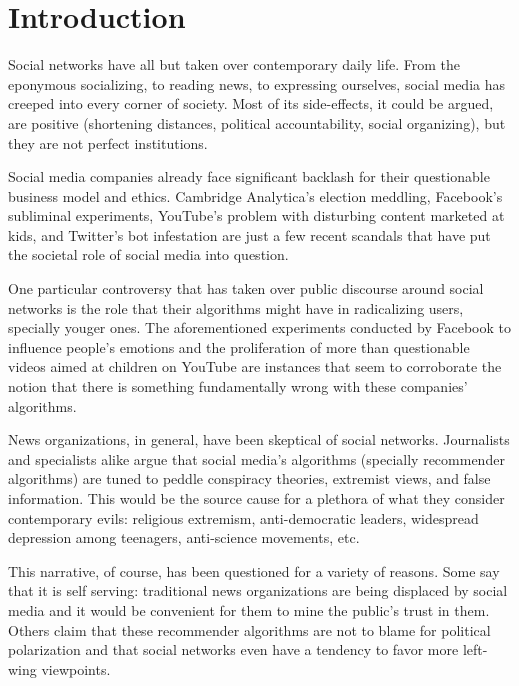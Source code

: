 
\chapter{Introduction}
\label{cap:introduction}

Social networks have all but taken over contemporary daily life. From the
eponymous socializing, to reading news, to expressing ourselves, social media
has creeped into every corner of society. Most of its side-effects, it could be
argued, are positive (shortening distances, political accountability, social
organizing), but they are not perfect institutions.

Social media companies already face significant backlash for their questionable
business model and ethics. Cambridge Analytica's election meddling, Facebook's
subliminal experiments, YouTube's problem with disturbing content marketed at
kids, and Twitter's bot infestation are just a few recent scandals that have put
the societal role of social media into question.

One particular controversy that has taken over public discourse around social
networks is the role that their algorithms might have in radicalizing users,
specially youger ones. The aforementioned experiments conducted by Facebook to
influence people's emotions and the proliferation of more than questionable
videos aimed at children on YouTube are instances that seem to corroborate the
notion that there is something fundamentally wrong with these companies'
algorithms.

News organizations, in general, have been skeptical of social networks.
Journalists and specialists alike argue that social media's algorithms
(specially recommender algorithms) are tuned to peddle conspiracy theories,
extremist views, and false information. This would be the source cause for a
plethora of what they consider contemporary evils: religious extremism,
anti-democratic leaders, widespread depression among teenagers, anti-science
movements, etc.

This narrative, of course, has been questioned for a variety of reasons. Some
say that it is self serving: traditional news organizations are being displaced
by social media and it would be convenient for them to mine the public's trust
in them. Others claim that these recommender algorithms are not to blame for
political polarization and that social networks even have a tendency to favor
more left-wing viewpoints.

